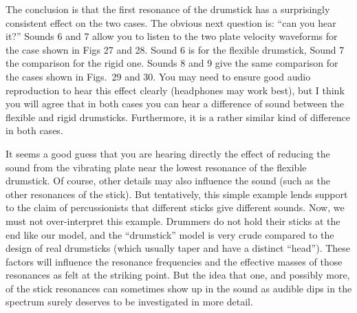 

  The conclusion is that the first resonance of the drumstick has a 
  surprisingly consistent effect on the two cases. The obvious next question 
  is: “can you hear it?” Sounds 6 and 7 allow you to listen to the two plate 
  velocity waveforms for the case shown in Figs 27 and 28. Sound 6 is for the 
  flexible drumstick, Sound 7 the comparison for the rigid one. Sounds 8 and 9 
  give the same comparison for the cases shown in Figs.\ 29 and 30. You may 
  need to ensure good audio reproduction to hear this effect clearly 
  (headphones may work best), but I think you will agree that in both cases you 
  can hear a difference of sound between the flexible and rigid drumsticks. 
  Furthermore, it is a rather similar kind of difference in both cases. 

\audio{}

\audio{}

\audio{}

\audio{}

  It seems a good guess that you are hearing directly the effect of reducing 
  the sound from the vibrating plate near the lowest resonance of the flexible 
  drumstick. Of course, other details may also influence the sound (such as the 
  other resonances of the stick). But tentatively, this simple example lends 
  support to the claim of percussionists that different sticks give different 
  sounds. Now, we must not over-interpret this example. Drummers do not hold 
  their sticks at the end like our model, and the “drumstick” model is very 
  crude compared to the design of real drumsticks (which usually taper and have 
  a distinct “head”). These factors will influence the resonance frequencies 
  and the effective masses of those resonances as felt at the striking point. 
  But the idea that one, and possibly more, of the stick resonances can 
  sometimes show up in the sound as audible dips in the spectrum surely 
  deserves to be investigated in more detail. 

